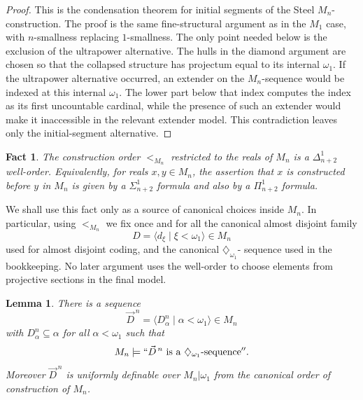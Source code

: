 \documentclass[a4paper,11pt]{article}
\newtheorem{lemma}[theorem]{Lemma}
\newtheorem{fact}[theorem]{Fact}
\begin{document}
\begin{proof}
This is the condensation theorem for initial segments of the Steel $M_n$-construction.  The proof is the same fine-structural argument as in the $M_1$ case, with $n$-smallness replacing $1$-smallness.  The only point needed below is the exclusion of the ultrapower alternative.  The hulls in the diamond argument are chosen so that the collapsed structure has projectum equal to its internal $\omega_1$.  If the ultrapower alternative occurred, an extender on the $M_n$-sequence would be indexed at this internal $\omega_1$.  The lower part below that index computes the index as its first uncountable cardinal, while the presence of such an extender would make it inaccessible in the relevant extender model.  This contradiction leaves only the initial-segment alternative.
\end{proof}

\begin{fact}\label{fact:mn-projective-wellorder}
The construction order $<_{M_n}$ restricted to the reals of $M_n$ is a $\Delta^1_{n+2}$ well-order.  Equivalently, for reals $x,y\in M_n$, the assertion that $x$ is constructed before $y$ in $M_n$ is given by a $\Sigma^1_{n+2}$ formula and also by a $\Pi^1_{n+2}$ formula.
\end{fact}

We shall use this fact only as a source of canonical choices inside \(M_n\).
In particular, using \(<_{M_n}\) we fix once and for all the canonical
almost disjoint family \[D=\langle d_\xi\mid \xi<\omega_1\rangle\in M_n\]
used for almost disjoint coding, and the canonical \(\diamondsuit_{\omega_1}\)-
sequence used in the bookkeeping.  No later argument uses the well-order
to choose elements from projective sections in the final model.



\begin{lemma}\label{lem:mn-diamond}
There is a sequence
\[
   \vec D^{\,n}=\langle D^n_\alpha\mid \alpha<\omega_1\rangle\in M_n
\]
with $D^n_\alpha\subseteq\alpha$ for all $\alpha<\omega_1$ such that
\[
   M_n\models ``\vec D^{\,n}\text{ is a }\diamondsuit_{\omega_1}\text{-sequence}''.
\]
Moreover $\vec D^{\,n}$ is uniformly definable over $M_n|\omega_1$ from the canonical order of construction of $M_n$.
\end{lemma}
\end{document}
